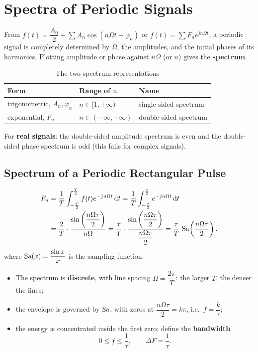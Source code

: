 \section{Spectra of Periodic Signals}

From $f(t)=\dfrac{A_0}{2}+\sum A_n\cos(n\Omega t+\varphi_n)$ or
$f(t)=\sum F_ne^{jn\Omega t}$, a periodic signal is completely determined by
$\Omega$, the amplitudes, and the initial phases of its harmonics. Plotting
amplitude or phase against $n\Omega$ (or $n$) gives the \textbf{spectrum}.

\begin{table}[htbp]
\centering
\caption{The two spectrum representations}
\begin{tabular}{@{}lll@{}}
\toprule
Form & Range of $n$ & Name \\
\midrule
trigonometric, $A_n,\varphi_n$ & $n\in[1,+\infty)$ & single-sided spectrum \\
exponential, $F_n$ & $n\in(-\infty,+\infty)$ & double-sided spectrum \\
\bottomrule
\end{tabular}
\end{table}

For \textbf{real signals}: the double-sided amplitude spectrum is even and the
double-sided phase spectrum is odd (this fails for complex signals).

\subsection{Spectrum of a Periodic Rectangular Pulse}

\[
\begin{aligned}
    F_n&=\frac{1}{T}\int_{-\frac{T}{2}}^{\frac{T}{2}}f(t)e^{-jn\Omega t}\,\mathrm{d} t
        =\frac{1}{T}\int_{-\frac{\tau}{2}}^{\frac{\tau}{2}}e^{-jn\Omega t}\,\mathrm{d} t\\
       &=\frac{2}{T}\cdot\frac{\sin\left(\dfrac{n\Omega\tau}{2}\right)}{n\Omega}
        =\frac{\tau}{T}\cdot
         \frac{\sin\left(\dfrac{n\Omega\tau}{2}\right)}{\dfrac{n\Omega\tau}{2}}
        =\frac{\tau}{T}\,\operatorname{Sa}\!\left(\frac{n\Omega\tau}{2}\right).
\end{aligned}
\]
where $\operatorname{Sa}(x)=\dfrac{\sin x}{x}$ is the sampling function.

\begin{itemize}
    \item The spectrum is \textbf{discrete}, with line spacing
          $\Omega=\dfrac{2\pi}{T}$: the larger $T$, the denser the lines;
    \item the envelope is governed by $\operatorname{Sa}$, with zeros at
          $\dfrac{n\Omega\tau}{2}=k\pi$, i.e.\ $f=\dfrac{k}{\tau}$;
    \item the energy is concentrated inside the first zero; define the
          \textbf{bandwidth}
    \[
        0\le f\le\frac{1}{\tau},\qquad \Delta F=\frac{1}{\tau}.
    \]
\end{itemize}

